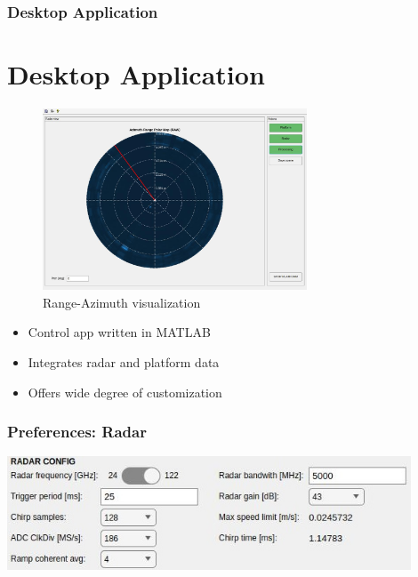 \documentclass[aspectratio=43]{beamer}
\begin{document}
\begin{frame}[fragile]
  \frametitle{Desktop Application}
  \section{Desktop Application}

  \begin{figure}[h!]
    \centering
    \includegraphics[width=0.7\textwidth]{../img/vis_range_azimuth.jpg}
    \caption[]{Range-Azimuth visualization}
  \end{figure}

  \begin{itemize}
    \item Control app written in MATLAB
    \item Integrates radar and platform data
    \item Offers wide degree of customization
  \end{itemize}
\end{frame}

\begin{frame}[fragile]
  \frametitle{Preferences: Radar}
  \begin{center}
    \includegraphics[width=0.9\textwidth]{../img/preferences_crop1.jpg}
  \end{center}
\end{frame}
\end{document}
